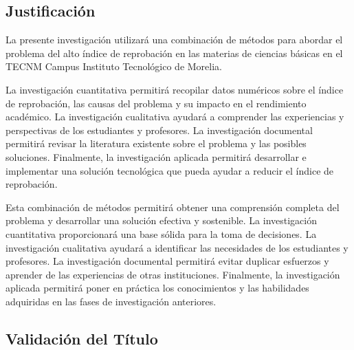 \documentclass{article}
\begin{document}
\subsection{Justificación}
La presente investigación utilizará una combinación de métodos para abordar el problema del alto índice de reprobación
 en las materias de ciencias básicas en el TECNM Campus Instituto Tecnológico de Morelia.

La investigación cuantitativa permitirá recopilar datos numéricos sobre el índice de reprobación, las causas del problema
 y su impacto en el rendimiento académico. La investigación cualitativa ayudará a comprender las experiencias y perspectivas
  de los estudiantes y profesores. La investigación documental permitirá revisar la literatura existente sobre el problema y 
  las posibles soluciones. Finalmente, la investigación aplicada permitirá desarrollar e implementar una solución tecnológica
   que pueda ayudar a reducir el índice de reprobación.

Esta combinación de métodos permitirá obtener una comprensión completa del problema y desarrollar una solución efectiva y 
sostenible. La investigación cuantitativa proporcionará una base sólida para la toma de decisiones. La investigación cualitativa
 ayudará a identificar las necesidades de los estudiantes y profesores. La investigación documental permitirá evitar duplicar esfuerzos
  y aprender de las experiencias de otras instituciones. Finalmente, la investigación aplicada permitirá poner en práctica los 
  conocimientos y las habilidades adquiridas en las fases de investigación anteriores.
  
\subsection{Validación del Título}
\end{document}
